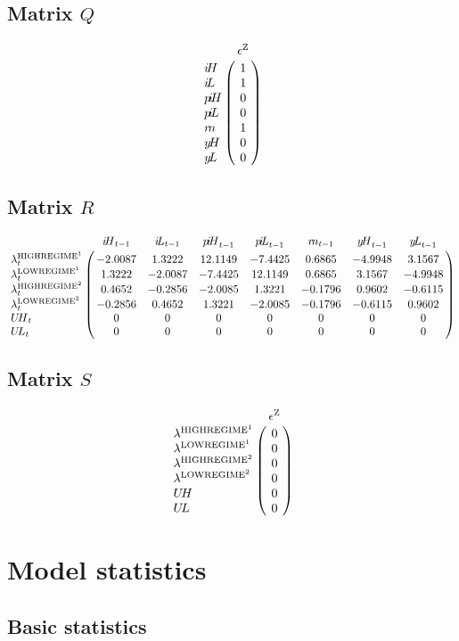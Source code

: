 \subsection*{Matrix $Q$}

$$\bordermatrix{
~ & \epsilon^{\mathrm{Z}} \cr
{i\!H} & 1 \cr
{i\!L} & 1 \cr
{p\!i\!H} & 0 \cr
{p\!i\!L} & 0 \cr
{r\!n} & 1 \cr
{y\!H} & 0 \cr
{y\!L} & 0 \cr
}$$

\subsection*{Matrix $R$}

$$\bordermatrix{
~ & {i\!H}_{t-1} & {i\!L}_{t-1} & {p\!i\!H}_{t-1} & {p\!i\!L}_{t-1} & {r\!n}_{t-1} & {y\!H}_{t-1} & {y\!L}_{t-1} \cr
\lambda^{\mathrm{HIGHREGIME}^{\mathrm{1}}}_{t} & -2.0087 & 1.3222 & 12.1149 & -7.4425 & 0.6865 & -4.9948 & 3.1567 \cr
\lambda^{\mathrm{LOWREGIME}^{\mathrm{1}}}_{t} & 1.3222 & -2.0087 & -7.4425 & 12.1149 & 0.6865 & 3.1567 & -4.9948 \cr
\lambda^{\mathrm{HIGHREGIME}^{\mathrm{2}}}_{t} & 0.4652 & -0.2856 & -2.0085 & 1.3221 & -0.1796 & 0.9602 & -0.6115 \cr
\lambda^{\mathrm{LOWREGIME}^{\mathrm{2}}}_{t} & -0.2856 & 0.4652 & 1.3221 & -2.0085 & -0.1796 & -0.6115 & 0.9602 \cr
{U\!H}_{t} & 0 & 0 & 0 & 0 & 0 & 0 & 0 \cr
{U\!L}_{t} & 0 & 0 & 0 & 0 & 0 & 0 & 0 \cr
}$$

\subsection*{Matrix $S$}

$$\bordermatrix{
~ & \epsilon^{\mathrm{Z}} \cr
\lambda^{\mathrm{HIGHREGIME}^{\mathrm{1}}} & 0 \cr
\lambda^{\mathrm{LOWREGIME}^{\mathrm{1}}} & 0 \cr
\lambda^{\mathrm{HIGHREGIME}^{\mathrm{2}}} & 0 \cr
\lambda^{\mathrm{LOWREGIME}^{\mathrm{2}}} & 0 \cr
{U\!H} & 0 \cr
{U\!L} & 0 \cr
}$$


\section{Model statistics}

\subsection{Basic statistics}

